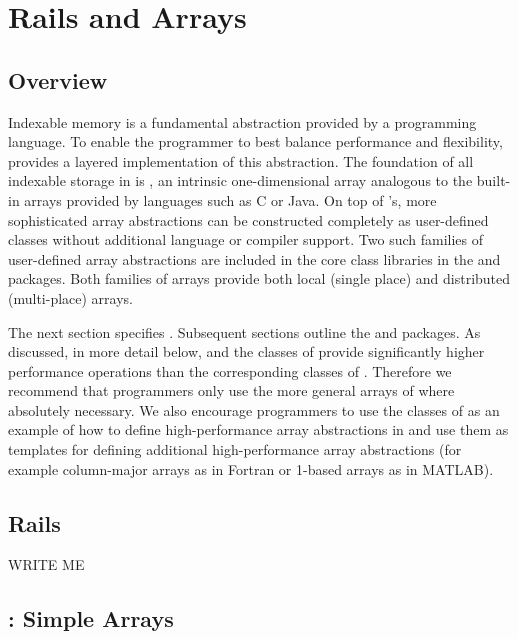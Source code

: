 \chapter{Rails and Arrays}\label{XtenArrays}

\section{Overview}

Indexable memory is a fundamental abstraction provided by a
programming language. To enable the programmer to best balance
performance and flexibility, \Xten{} provides a layered implementation
of this abstraction. The foundation of all indexable storage in
\Xten{} is , an intrinsic one-dimensional array
analogous to the built-in arrays provided by languages such as C or
Java. On top of 's, more sophisticated array abstractions
can be constructed completely as user-defined \Xten{} classes without
additional language or compiler support. Two such families of
user-defined array abstractions are included in the \Xten{} core class
libraries in the  and  packages.
Both families of arrays provide both local (single place) and
distributed (multi-place) arrays. 

The next section specifies .  Subsequent sections outline
the  and  packages.  As discussed,
in more detail below,  and the classes of 
provide significantly higher performance operations than the
corresponding classes of . Therefore we recommend
that programmers only use the more general arrays of
 where absolutely necessary.  We also encourage
programmers to use the classes of  as an example of how
to define high-performance array abstractions in \Xten{} and use them
as templates for defining additional high-performance array
abstractions (for example column-major arrays as in Fortran or 1-based
arrays as in MATLAB).

\section{Rails}

WRITE ME

\section{: Simple Arrays}

